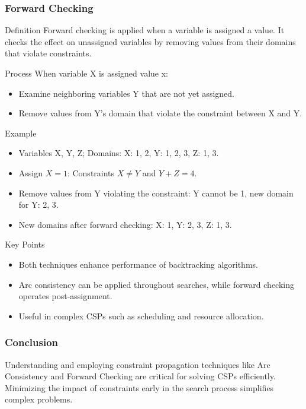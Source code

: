 \documentclass[aspectratio=169]{beamer}
\begin{document}
\begin{frame}[fragile]
    \frametitle{Forward Checking}
    \begin{block}{Definition}
        Forward checking is applied when a variable is assigned a value. It checks the effect on unassigned variables 
        by removing values from their domains that violate constraints.
    \end{block}
    
    \begin{block}{Process}
        When variable X is assigned value x:
        \begin{itemize}
            \item Examine neighboring variables Y that are not yet assigned.
            \item Remove values from Y's domain that violate the constraint between X and Y.
        \end{itemize}
    \end{block}

    \begin{block}{Example}
        \begin{itemize}
            \item Variables X, Y, Z; Domains: X: {1, 2}, Y: {1, 2, 3}, Z: {1, 3}.
            \item Assign $X = 1$: Constraints $X \neq Y$ and $Y + Z = 4$.
            \item Remove values from Y violating the constraint: Y cannot be 1, new domain for Y: {2, 3}.
            \item New domains after forward checking: X: {1}, Y: {2, 3}, Z: {1, 3}.
        \end{itemize}
    \end{block}

    \begin{block}{Key Points}
        \begin{itemize}
            \item Both techniques enhance performance of backtracking algorithms.
            \item Arc consistency can be applied throughout searches, while forward checking operates post-assignment.
            \item Useful in complex CSPs such as scheduling and resource allocation.
        \end{itemize}
    \end{block}
\end{frame}

\begin{frame}[fragile]
    \frametitle{Conclusion}
    Understanding and employing constraint propagation techniques like Arc Consistency and Forward Checking are critical for 
    solving CSPs efficiently. Minimizing the impact of constraints early in the search process simplifies complex problems.
\end{frame}
\end{document}
